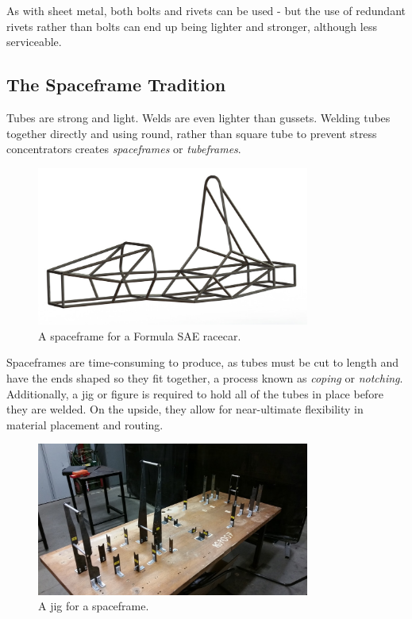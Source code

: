 	As with sheet metal, both bolts and rivets can be used - but the use of redundant rivets rather than bolts can end up being lighter and stronger, although less serviceable. 
	
	\subsection{The Spaceframe Tradition}
	Tubes are strong and light. Welds are even lighter than gussets. Welding tubes together directly and using round, rather than square tube to prevent stress concentrators creates \textit{spaceframes} or \textit{tubeframes}.
	
	
	\begin{figure}[H]
		\includegraphics[width=0.8\textwidth]{imgs/tradition_tubeframe.jpeg}
		\caption{A spaceframe for a Formula SAE racecar.}
	\end{figure}
	
	Spaceframes are time-consuming to produce, as tubes must be cut to length and have the ends shaped so they fit together, a process known as \textit{coping} or \textit{notching}. Additionally, a jig or figure is required to hold all of the tubes in place before they are welded. On the upside, they allow for near-ultimate flexibility in material placement and routing.
	
	\begin{figure}[H]
		\includegraphics[width=0.8\textwidth]{imgs/tradition_tubeframe_jigging.jpeg}
		\caption{A jig for a spaceframe.}
	\end{figure}